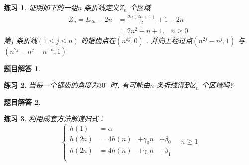 \documentclass[mode=geye, chinesefont=founder]{elegantnote}
\newtheorem{exercise}{练习}
\newtheorem{answer}{题目解答}
\begin{document}
\begin{exercise}
	证明如下的一组$ n $ 条折线定义$ Z_n $ 个区域
	\begin{equation}
		\begin{aligned}
			Z_n = L_{2n}-2n &= \frac{2n(2n+1)}{2}+1-2n \\
			&=2n^2-n+1. \quad n\geqslant 0.
		\end{aligned}
	\end{equation}
	第$ j $ 条折线$ (1\leqslant j\leqslant n) $ 的锯齿点在$ (n^{kj},0) $ . 并向上经过点$ (n^{2j}-n^j,1) $ 与 $ (n^{2j}-n^j-n^{-n}, 1) $ 
\end{exercise}

\begin{answer}
	
\end{answer}

\begin{exercise}
	当每一个锯齿的角度为$ 30^{\circ} $ 时, 有可能由$ n $ 条折线得到$ Z_n $ 个区域吗?
\end{exercise}

\begin{answer}
	
\end{answer}

\begin{exercise}
	利用成套方法解递归式：
	\begin{equation*}
		\left\{
			\begin{array}{llll}
				h(1) &= \alpha &&\\
				h(2n) &= 4h(n) &+\gamma_0 n&+\beta_0\\
				h(2n) &= 4h(n) &+\gamma_1 n&+\beta_1\\
			\end{array}
		\right.\quad n\geqslant 1
	\end{equation*}
\end{exercise}
\end{document}
